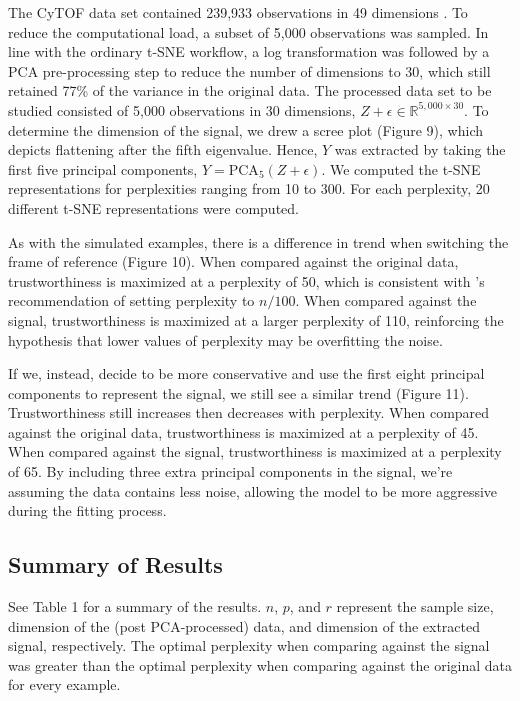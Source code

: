 \documentclass{article}
\begin{document}
The CyTOF data set contained 239,933 observations in 49 dimensions \cite{CyTOF data}. To reduce the computational load, a subset of 5,000 observations was sampled. In line with the ordinary t-SNE workflow, a log transformation was followed by a PCA pre-processing step to reduce the number of dimensions to 30, which still retained 77\% of the variance in the original data. The processed data set to be studied consisted of 5,000 observations in 30 dimensions, $Z + \epsilon \in \mathbb{R}^{5,000 \times 30}$. To determine the dimension of the signal, we drew a scree plot (Figure 9), which depicts flattening after the fifth eigenvalue. Hence, $Y$ was extracted by taking the first five principal components, $Y = \textrm{PCA}_5(Z + \epsilon)$. We computed the t-SNE representations for perplexities ranging from 10 to 300. For each perplexity, 20 different t-SNE representations were computed.

As with the simulated examples, there is a difference in trend when switching the frame of reference (Figure 10). When compared against the original data, trustworthiness is maximized at a perplexity of 50, which is consistent with \cite{t-SNE cell}'s recommendation of setting perplexity to $n/100$. When compared against the signal, trustworthiness is maximized at a larger perplexity of 110, reinforcing the hypothesis that lower values of perplexity may be overfitting the noise. 

If we, instead, decide to be more conservative and use the first eight principal components to represent the signal, we still see a similar trend (Figure 11). Trustworthiness still increases then decreases with perplexity. When compared against the original data, trustworthiness is maximized at a perplexity of 45. When compared against the signal, trustworthiness is maximized at a perplexity of 65. By including three extra principal components in the signal, we're assuming the data contains less noise, allowing the model to be more aggressive during the fitting process.

\subsection{Summary of Results}
See Table 1 for a summary of the results. $n$, $p$, and $r$ represent the sample size, dimension of the (post PCA-processed) data, and dimension of the extracted signal, respectively. The optimal perplexity when comparing against the signal was greater than the optimal perplexity when comparing against the original data for every example.
\end{document}

